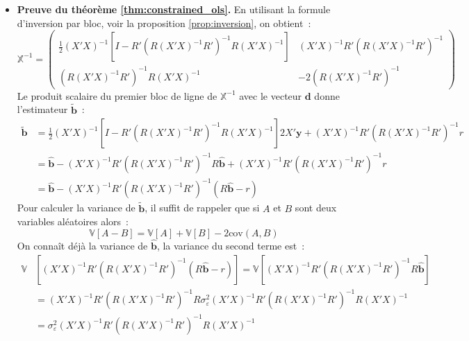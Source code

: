 \documentclass[10pt]{beamer}
\theoremstyle{plain}
\begin{document}
\begin{notes}

  \begin{itemize}

  \item \textbf{Preuve du théorème \ref{thm:constrained_ols}.} En
    utilisant la formule d'inversion par bloc, voir la proposition
    \ref{prop:inversion}, on obtient~:
    {\tiny\[
      \mathbb X^{-1} =
      \begin{pmatrix}
        \frac{1}{2}(X'X)^{-1}\left[I-R'\left(R(X'X)^{-1}R'\right)^{-1}R(X'X)^{-1}\right] & (X'X)^{-1}R'\left(R(X'X)^{-1}R'\right)^{-1}\\
        \left(R(X'X)^{-1}R'\right)^{-1}R(X'X)^{-1} & -2\left(R(X'X)^{-1}R'\right)^{-1}
      \end{pmatrix}
    \]}
    Le produit scalaire du premier bloc de ligne de $\mathbb X^{-1}$ avec le vecteur $\mathbf d$ donne l'estimateur $\tilde{\mathbf b}$~:
    {\tiny
      \[
        \begin{split}
          \tilde{\mathbf b} &= \frac{1}{2}(X'X)^{-1}\left[I-R'\left(R(X'X)^{-1}R'\right)^{-1}R(X'X)^{-1}\right]2X'\mathbf y + (X'X)^{-1}R'\left(R(X'X)^{-1}R'\right)^{-1}r\\
                            &= \hat{\mathbf b} - (X'X)^{-1}R'\left(R(X'X)^{-1}R'\right)^{-1}R\hat{\mathbf b} + (X'X)^{-1}R'\left(R(X'X)^{-1}R'\right)^{-1}r\\
                            &= \hat{\mathbf b} - (X'X)^{-1}R'\left(R(X'X)^{-1}R'\right)^{-1}\left(R\hat{\mathbf b}-r\right)
        \end{split}
    \]}
  Pour calculer la variance de $\tilde{\mathbf b}$, il suffit de rappeler que si $A$ et $B$ sont deux variables aléatoires alors~:
  \[
    \mathbb V\left[ A - B \right] = \mathbb V\left[ A \right] + \mathbb V\left[ B \right] -2 \mathrm{cov}\left(A, B\right)
  \]
  On connaît déjà la variance de $\hat{\mathbf b}$, la variance du second terme est~:
  {\tiny
  \[
    \begin{split}
      \mathbb V&\left[ (X'X)^{-1}R'\left(R(X'X)^{-1}R'\right)^{-1}\left(R\hat{\mathbf b}-r\right) \right] = \mathbb V\left[ (X'X)^{-1}R'\left(R(X'X)^{-1}R'\right)^{-1}R\hat{\mathbf b} \right]\\
      &= (X'X)^{-1}R'\left(R(X'X)^{-1}R'\right)^{-1}R\sigma_{\varepsilon}^2(X'X)^{-1}R'\left(R(X'X)^{-1}R'\right)^{-1}R(X'X)^{-1}\\
      &=\sigma_{\varepsilon}^2(X'X)^{-1}R'\left(R(X'X)^{-1}R'\right)^{-1}R(X'X)^{-1}
    \end{split}
\]}
\end{itemize}
\end{notes}
\end{document}
